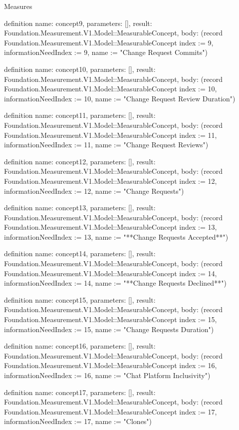 \begin{lexlean}{Measures}
\begin{semanticmodule}
definition{
  name: concept9,
  parameters: [],
  result: Foundation.Measurement.V1.Model::MeasurableConcept,
  body: (record Foundation.Measurement.V1.Model::MeasurableConcept {index := 9, informationNeedIndex := 9, name := "Change Request Commits"})
}

definition{
  name: concept10,
  parameters: [],
  result: Foundation.Measurement.V1.Model::MeasurableConcept,
  body: (record Foundation.Measurement.V1.Model::MeasurableConcept {index := 10, informationNeedIndex := 10, name := "Change Request Review Duration"})
}

definition{
  name: concept11,
  parameters: [],
  result: Foundation.Measurement.V1.Model::MeasurableConcept,
  body: (record Foundation.Measurement.V1.Model::MeasurableConcept {index := 11, informationNeedIndex := 11, name := "Change Request Reviews"})
}

definition{
  name: concept12,
  parameters: [],
  result: Foundation.Measurement.V1.Model::MeasurableConcept,
  body: (record Foundation.Measurement.V1.Model::MeasurableConcept {index := 12, informationNeedIndex := 12, name := "Change Requests"})
}

definition{
  name: concept13,
  parameters: [],
  result: Foundation.Measurement.V1.Model::MeasurableConcept,
  body: (record Foundation.Measurement.V1.Model::MeasurableConcept {index := 13, informationNeedIndex := 13, name := "**Change Requests Accepted**"})
}

definition{
  name: concept14,
  parameters: [],
  result: Foundation.Measurement.V1.Model::MeasurableConcept,
  body: (record Foundation.Measurement.V1.Model::MeasurableConcept {index := 14, informationNeedIndex := 14, name := "**Change Requests Declined**"})
}

definition{
  name: concept15,
  parameters: [],
  result: Foundation.Measurement.V1.Model::MeasurableConcept,
  body: (record Foundation.Measurement.V1.Model::MeasurableConcept {index := 15, informationNeedIndex := 15, name := "Change Requests Duration"})
}

definition{
  name: concept16,
  parameters: [],
  result: Foundation.Measurement.V1.Model::MeasurableConcept,
  body: (record Foundation.Measurement.V1.Model::MeasurableConcept {index := 16, informationNeedIndex := 16, name := "Chat Platform Inclusivity"})
}

definition{
  name: concept17,
  parameters: [],
  result: Foundation.Measurement.V1.Model::MeasurableConcept,
  body: (record Foundation.Measurement.V1.Model::MeasurableConcept {index := 17, informationNeedIndex := 17, name := "Clones"})
}


\end{semanticmodule}
\end{lexlean}
